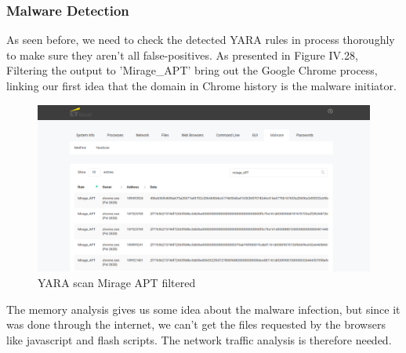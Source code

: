 \subsubsection{Malware Detection}
As seen before, we need to check the detected YARA rules in process thoroughly to make sure they aren't all false-positives. As presented in Figure IV.28, Filtering the output to 'Mirage\_APT' bring out the Google Chrome process, linking our first idea that the domain in Chrome history is the malware initiator.
\begin{figure}[H]
\centering
\includegraphics[width=0.9\columnwidth]{Figures/28.png}
\caption{YARA scan Mirage APT filtered}
\end{figure}
The memory analysis gives us some idea about the malware infection, but since it was done through the internet, we can't get the files requested by the browsers like javascript and flash scripts. The network traffic analysis is therefore needed.
